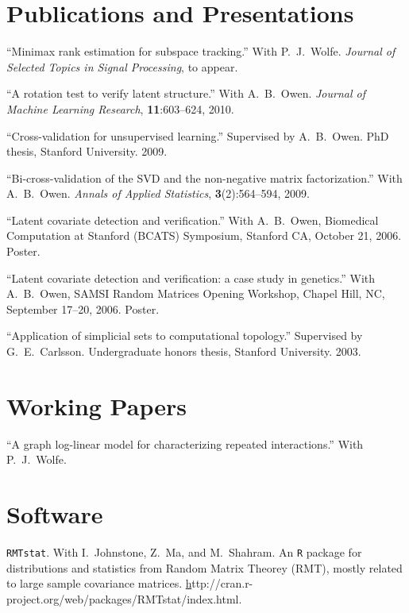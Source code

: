 \documentclass[overlapped,line,letterpaper]{res}
\begin{document}
\begin{resume}

\section{\bf Publications and Presentations}

``Minimax rank estimation for subspace tracking.''
With P.\ J.\ Wolfe.
\textit{Journal of Selected Topics in Signal Processing},
to appear.

``A rotation test to verify latent structure.''
With A.\ B.\ Owen.
\textit{Journal of Machine Learning Research},
\textbf{11}:603--624, 2010.

``Cross-validation for unsupervised learning.''
Supervised by A.\ B.\ Owen.
PhD thesis, Stanford University. 2009.

``Bi-cross-validation of the SVD and the non-negative matrix factorization.''
With A.\ B.\ Owen.
\textit{Annals of Applied Statistics},
\textbf{3}(2):564--594, 2009.

``Latent covariate detection and verification.''
With A.\ B.\ Owen, 
Biomedical Computation at Stanford (BCATS) Symposium, Stanford CA, October 21, 2006.
Poster.

``Latent covariate detection and verification: a case study in genetics.''
With A.\ B.\ Owen, SAMSI Random Matrices Opening Workshop, Chapel Hill, NC, 
September 17--20, 2006. Poster. 

``Application of simplicial sets to computational topology.''
Supervised by G.\ E.\ Carlsson.
Undergraduate honors thesis, Stanford University. 2003.

\section{\bf Working Papers}

``A graph log-linear model for characterizing repeated interactions.''
With P.\ J.\ Wolfe.




\section{\bf Software}

{\texttt{RMTstat}}. With I.\ Johnstone, Z.\ Ma, and M.\ Shahram.
An \texttt{R} package for distributions and statistics from Random Matrix Theorey (RMT),
mostly related to large sample covariance matrices.
\href{http://cran.r-project.org/web/packages/RMTstat/index.html}http://cran.r-project.org/web/packages/RMTstat/index.html.


\end{resume}
\end{document}
